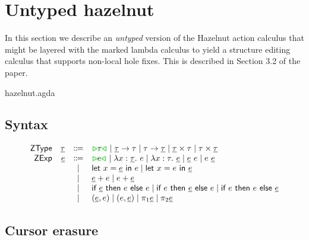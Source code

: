 \documentclass[formalism.tex]{subfiles}
\begin{document}




\section{Untyped hazelnut}
\label{sec:untyped}
In this section we describe an \emph{untyped} version of the Hazelnut action calculus that might be
layered with the marked lambda calculus to yield a structure editing calculus that supports
non-local hole fixes. This is described in Section 3.2 of the paper.

\begin{mechanization}
  \item hazelnut.agda
\end{mechanization}

\subsection{Syntax}
\label{sec:untyped-syntax}
\[\begin{array}{rrcl}
  \ZTMName & \ZTMV & \Coloneqq & \ZTCursor{\TMV} \mid \ZTArrowL{\ZTMV}{\TMV} \mid \ZTArrowR{\TMV}{\ZTMV} \mid \ZTProdL{\ZTMV}{\TMV} \mid \ZTProdR{\TMV}{\ZTMV} \\
  \ZMName  & \ZMV  & \Coloneqq & \ZCursor{\EMV} \mid \ZLamT{x}{\ZTMV}{\EMV} \mid \ZLamE{x}{\TMV}{\ZMV} \mid \ZApL{\ZMV}{\EMV} \mid \ZApR{\EMV}{\ZMV} \\
           &       & \mid         & \ZLetL{x}{\ZMV}{\EMV} \mid \ZLetR{x}{\EMV}{\ZMV} \\
           &       & \mid         & \ZPlusL{\ZMV}{\EMV} \mid \ZPlusR{\EMV}{\ZMV} \\
           &       & \mid         & \ZIfC{\ZMV}{\EMV}{\EMV} \mid \ZIfL{\EMV}{\ZMV}{\EMV} \mid \ZIfR{\EMV}{\EMV}{\ZMV} \\
           &       & \mid         & \ZPairL{\ZMV}{\EMV} \mid \ZPairR{\EMV}{\ZMV} \mid \ZProjL{\ZMV} \mid \ZProjR{\ZMV} \\
\end{array}\]

\subsection{Cursor erasure}
\label{sec:untyped-cursor-erasure}
\end{document}
